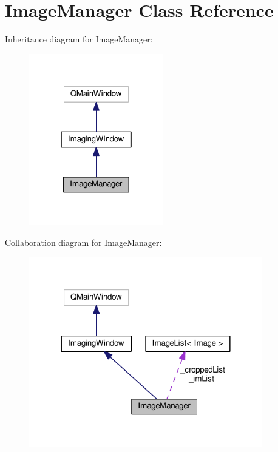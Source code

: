 \hypertarget{classImageManager}{}\section{Image\+Manager Class Reference}
\label{classImageManager}


Inheritance diagram for Image\+Manager\+:\nopagebreak
\begin{figure}[H]
\begin{center}
\leavevmode
\includegraphics[width=166pt]{classImageManager__inherit__graph}
\end{center}
\end{figure}


Collaboration diagram for Image\+Manager\+:\nopagebreak
\begin{figure}[H]
\begin{center}
\leavevmode
\includegraphics[width=288pt]{classImageManager__coll__graph}
\end{center}
\end{figure}
